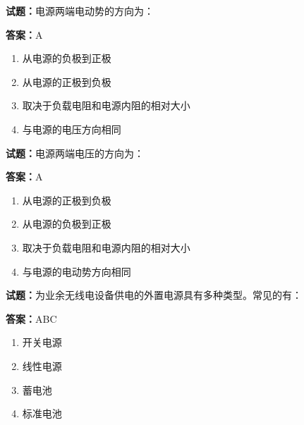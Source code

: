 \documentclass{ctexbook}
\begin{document}




\vspace{1em}

\textbf{试题：}电源两端电动势的方向为： 

\textbf{答案：}A 

\begin{enumerate}[leftmargin=3em]
  \item 从电源的负极到正极 

  \item 从电源的正极到负极 

  \item 取决于负载电阻和电源内阻的相对大小 

  \item 与电源的电压方向相同 

\end{enumerate}





\vspace{1em}

\textbf{试题：}电源两端电压的方向为： 

\textbf{答案：}A 


\begin{enumerate}[leftmargin=3em]
  \item 从电源的正极到负极 

  \item 从电源的负极到正极 

  \item 取决于负载电阻和电源内阻的相对大小 

  \item 与电源的电动势方向相同 

\end{enumerate}





\vspace{1em}

\textbf{试题：}为业余无线电设备供电的外置电源具有多种类型。常见的有： 

\textbf{答案：}ABC 

\begin{enumerate}[leftmargin=3em]
  \item 开关电源 

  \item 线性电源 

  \item 蓄电池 

  \item 标准电池 

\end{enumerate}
\end{document}
